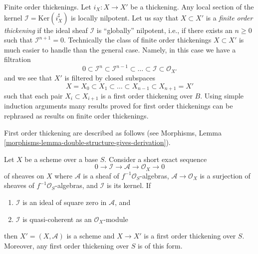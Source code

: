 \noindent
Finite order thickenings. Let $i_X : X \to X'$ be a thickening.
Any local section of the kernel
$\mathcal{I} = \text{Ker}(i_X^\sharp)$ is locally nilpotent.
Let us say that $X \subset X'$ is a {\it finite order thickening}
if the ideal sheaf $\mathcal{I}$ is ``globally'' nilpotent, i.e.,
if there exists an $n \geq 0$ such that $\mathcal{I}^{n + 1} = 0$.
Technically the class of finite order thickenings $X \subset X'$
is much easier to handle than the general case.
Namely, in this case we have a filtration
$$
0 \subset \mathcal{I}^n \subset \mathcal{I}^{n - 1} \subset
\ldots \subset \mathcal{I} \subset \mathcal{O}_{X'}
$$
and we see that $X'$ is filtered by closed subspaces
$$
X = X_0 \subset X_1 \subset \ldots \subset X_{n - 1} \subset X_{n + 1} = X'
$$
such that each pair $X_i \subset X_{i + 1}$ is a first order thickening
over $B$. Using simple induction arguments many results proved for first order
thickenings can be rephrased as results on finite order thickenings.

\noindent
First order thickening are described as follows (see
Morphisms, Lemma \ref{morphisms-lemma-double-structure-gives-derivation}).

\begin{lemma}
\label{lemma-first-order-thickening}
Let $X$ be a scheme over a base $S$. Consider a short exact sequence
$$
0 \to \mathcal{I} \to \mathcal{A} \to \mathcal{O}_X \to 0
$$
of sheaves on $X$ where $\mathcal{A}$ is a sheaf of
$f^{-1}\mathcal{O}_S$-algebras,
$\mathcal{A} \to \mathcal{O}_X$ is a surjection
of sheaves of $f^{-1}\mathcal{O}_S$-algebras, and $\mathcal{I}$ is its kernel.
If
\begin{enumerate}
\item $\mathcal{I}$ is an ideal of square zero in $\mathcal{A}$, and
\item $\mathcal{I}$ is quasi-coherent as an $\mathcal{O}_X$-module
\end{enumerate}
then $X' = (X, \mathcal{A})$ is a scheme and $X \to X'$ is a first
order thickening over $S$. Moreover, any first order thickening over
$S$ is of this form.
\end{lemma}

